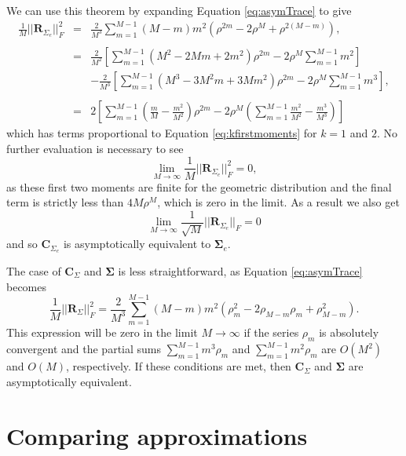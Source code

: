 \documentclass[letterpaper,12pt,oneside,final]{article}
\newcommand{\m}[1]{\mathbf{#1}}               %
\newcommand{\sm}[1]{\boldsymbol{#1}}   %
\newcommand{\norm}[1]{||{#1}||}              %
\newcommand{\frob}[1]{\norm{#1}_F}
\begin{document}
We can use this theorem by expanding Equation \ref{eq:asymTrace} to give
\begin{eqnarray}
  \frac{1}{M} \frob{\m{R}_{\Sigma_e}}^2 & = & \frac{2}{M^3} \sum_{m = 1}^{M-1} (M-m) m^2 \left ( \rho^{2m} - 2 \rho^{M} + \rho^{2(M - m)} \right ), \nonumber \\
  & & \nonumber \\
  & = & \frac{2}{M^2} \left [ \sum_{m = 1}^{M-1} (M^2 - 2Mm + 2m^2) \rho^{2m} - 2 \rho^M \sum_{m = 1}^{M-1} m^2 \right ] \nonumber \\
  & & - \frac{2}{M^3} \left [ \sum_{m = 1}^{M-1} (M^3 - 3M^2m + 3Mm^2) \rho^{2m} - 2 \rho^M \sum_{m = 1}^{M-1} m^3 \right ], \nonumber \\
  & & \nonumber \\
  & = & 2 \left [ \sum_{m = 1}^{M-1} \left ( \frac{m}{M} - \frac{m^2}{M^2} \right ) \rho^{2m} - 2 \rho^M \left ( \sum_{m = 1}^{M-1} \frac{m^2}{M^2} - \frac{m^3}{M^3} \right ) \right ] \label{eq:frobeniussimp}
\end{eqnarray}
which has terms proportional to Equation \ref{eq:kfirstmoments} for $k = 1$ and $2$. No further evaluation is necessary to see
$$ \lim_{M \rightarrow \infty} \frac{1}{M} \frob{\m{R}_{\Sigma_e}}^2 = 0,$$
as these first two moments are finite for the geometric distribution and the final term is strictly less than $4M \rho^M$, which is zero in the limit. As a result we also get
$$ \lim_{M \rightarrow \infty} \frac{1}{\sqrt{M}} \frob{\m{R}_{\Sigma_e}} = 0$$
and so $\m{C}_{\Sigma_e}$ is asymptotically equivalent to $\sm{\Sigma}_e$.

The case of $\m{C}_{\Sigma}$ and $\sm{\Sigma}$ is less straightforward, as Equation \ref{eq:asymTrace} becomes
\begin{equation} \label{eq:nonexponent}
  \frac{1}{M} \frob{\m{R}_{\Sigma}}^2 = \frac{2}{M^3} \sum_{m = 1}^{M-1} (M-m) m^2 \left ( \rho_m^2 - 2 \rho_{M-m} \rho_m + \rho_{M - m}^2 \right ).
\end{equation}
This expression will be zero in the limit $M \rightarrow \infty$ if the series $\rho_m$ is absolutely convergent and the partial sums $\sum_{m = 1}^{M-1}m^3 \rho_m$ and $\sum_{m = 1}^{M-1} m^2 \rho_m$ are $O(M^2)$ and $O(M)$, respectively. If these conditions are met, then $\m{C}_{\Sigma}$ and $\sm{\Sigma}$ are asymptotically equivalent.

\section{Comparing approximations} \label{c:multipleTesting:rateConverge}
  
\end{document}

